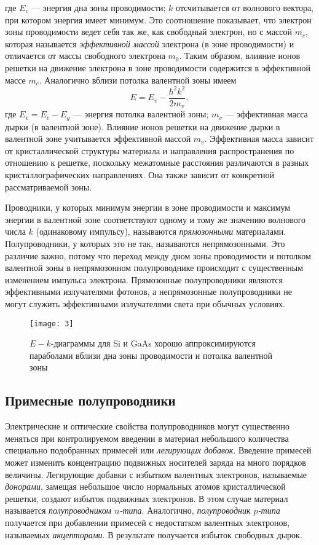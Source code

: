 \documentclass[a4paper, 12pt]{article}
\begin{document}
где $E_{c}$ --- энергия дна зоны проводимости; $k$ отсчитывается от
волнового вектора, при котором энергия имеет минимум. Это соотношение
показывает, что электрон зоны проводимости ведет себя так же, как
свободный электрон, но с массой $m_{c}$, которая называется
\emph{эффективной массой} электрона (в зоне проводимости) и отличается
от массы свободного электрона $m_{0}$. Таким образом, влияние ионов
решетки на движение электрона в зоне проводимости содержится в
эффективной массе $m_{c}$. Аналогично вблизи потолка валентной зоны
имеем 
\begin{equation}
    E=E_{v}-\dfrac{\hbar^2 k^2}{2 m_{v}},
    \label{eq:3}
\end{equation}
где $E_{v}=E_{c}-E_{g}$ --- энергия потолка валентной зоны; $m_{v}$
--- эффективная масса дырки (в валентной зоне). Влияние ионов решетки
на движение дырки в валентной зоне учитывается эффективной массой
$m_{v}$. Эффективная масса зависит от кристаллической структуры
материала и направления распространения по отношению к решетке,
поскольку межатомные расстояния различаются в разных
кристаллографических направлениях. Она также зависит от конкретной
рассматриваемой зоны.

Проводники, у которых минимум энергии в зоне проводимости и максимум
энергии в валентной зоне соответствуют одному и тому же значению
волнового числа $k$ (одинаковому импульсу), называются
\emph{прямозонными} материалами. Полупроводники, у которых это не так,
называются непрямозонными. Это различие важно, потому что переход
между дном зоны проводимости и потолком валентной зоны в непрямозонном
полупроводнике происходит с существенным изменением импульса
электрона. Прямозонные полупроводники являются эффективными
излучателями фотонов, а непрямозонные полупроводники не могут служить
эффективными излучателями света при обычных условиях.


\begin{figure}[H]
    \texttt{[image: 3]} 
    \caption{$E-k$-диаграммы для Si и GaAs хорошо аппроксимируются
    параболами вблизи дна зоны проводимости и потолка валентной зоны}
    \label{fig:3}
\end{figure}



\subsection{Примесные полупроводники}
Электрические и оптические свойства полупроводников могут существенно
меняться при контролируемом введении в материал небольшого
количества специально подобранных примесей или \emph{легирующих
добавок}. Введение примесей может изменить концентрацию подвижных
носителей заряда на много порядков величины. Легирующие добавки с
избытком валентных электронов, называемые \emph{донорами}, замещая
небольшое число нормальных атомов кристаллической решетки, создают
избыток подвижных электронов. В этом случае материал называется
\emph{полупроводником $n$-типа}. Аналогично, \emph{полупроводник
$p$-типа} получается при добавлении примесей с недостатком валентных
электронов, называемых \emph{акцепторами}. В результате получается
избыток свободных дырок. 
\end{document}
